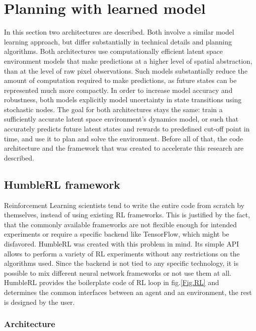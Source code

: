 \section{Planning with learned model}

In this section two architectures are described. Both involve a similar model learning approach, but differ substantially in technical details and planning algorithms. Both architectures use computationally efficient latent space environment models that make predictions at a higher level of spatial abstraction, than at the level of raw pixel observations. Such models substantially reduce the amount of computation required to make predictions, as future states can be represented much more compactly. In order to increase model accuracy and robustness, both models explicitly model uncertainty in state transitions using stochastic nodes. \cite{Algo.FastGenerativeModels}
The goal for both architectures stays the same: train a sufficiently accurate latent space environment's dynamics model, or such that accurately predicts future latent states and rewards to predefined cut-off point in time, and use it to plan and solve the environment. 
Before all of that, the code architecture and the framework that was created to accelerate this research are described.

\subsection{HumbleRL framework}

Reinforcement Learning scientists tend to write the entire code from scratch by themselves, instead of using existing RL frameworks. This is justified by the fact, that the commonly available frameworks are not flexible enough for intended experiments or require a specific backend like TensorFlow, which might be disfavored.
HumbleRL \cite{Code.HRL} was created with this problem in mind. Its simple API allows to perform a variety of RL experiments without any restrictions on the algorithms used. Since the backend is not tied to any specific technology, it is possible to mix different neural network frameworks or not use them at all. HumbleRL provides the boilerplate code of RL loop in fig.\ref{Fig.RL} and determines the common interfaces between an agent and an environment, the rest is designed by the user.

\subsubsection{Architecture}

